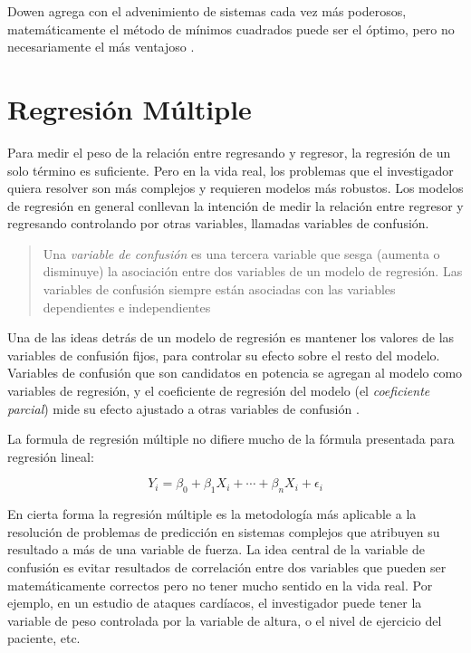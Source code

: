 \documentclass[letterpaper, spanish, 11pt]{report}
\begin{document}
Dowen agrega con el advenimiento de sistemas cada vez más poderosos, matemáticamente el método de mínimos cuadrados puede ser el óptimo, pero no necesariamente el más ventajoso \cite{thinkStats}.

\section{Regresión Múltiple}
Para medir el peso de la relación entre regresando y regresor, la regresión de un solo término es suficiente. Pero en la vida real, los problemas que el investigador quiera resolver son más complejos y requieren modelos más robustos.  Los modelos de regresión en general conllevan la intención de medir la relación entre regresor y regresando controlando por otras variables, llamadas variables de confusión.

\begin{quotation}
	Una \emph{variable de confusión} es una tercera variable que sesga (aumenta o disminuye) la asociación entre dos variables de un modelo de regresión. Las variables de confusión siempre están asociadas con las variables dependientes e independientes \cite{daroczi}
\end{quotation}

Una de las ideas detrás de un modelo de regresión es mantener los valores de las variables de confusión fijos, para controlar su efecto sobre el resto del modelo. Variables de confusión que son candidatos en potencia se agregan al modelo como variables de regresión, y el coeficiente de regresión del modelo (el \emph{coeficiente parcial}) mide su efecto ajustado a otras variables de confusión \cite{daroczi}.

La formula de regresión múltiple no difiere mucho de la fórmula presentada para regresión lineal:

\begin{equation}
Y_{i} = \beta_{0} + \beta_{1}X_{i} + \cdots + \beta_{n}X_{i} + \epsilon_{i}
\end{equation}

En cierta forma la regresión múltiple es la metodología más aplicable a la resolución de problemas de predicción en sistemas complejos que atribuyen su resultado a más de una variable de fuerza. La idea central de la variable de confusión es evitar resultados de correlación entre dos variables que pueden ser matemáticamente correctos pero no tener mucho sentido en la vida real. Por ejemplo, en un estudio de ataques cardíacos, el investigador puede tener la variable de peso controlada por la variable de altura, o el nivel de ejercicio del paciente, etc.
\end{document}
